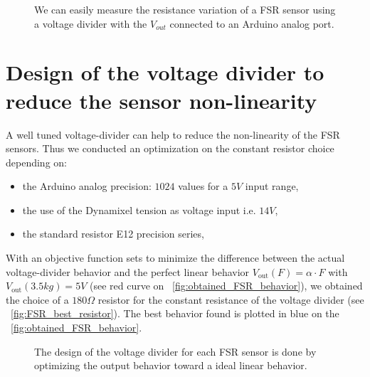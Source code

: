 \begin{figure}[!ht]
\centering
    \hfil
    \caption{We can easily measure the resistance variation of a FSR sensor using a voltage divider with the $V_{out}$ connected to an Arduino analog port.}
    \label{fig:test_sensors}
\end{figure}

\section{Design of the voltage divider to reduce the sensor non-linearity} %

A well tuned voltage-divider can help to reduce the non-linearity of the FSR sensors. Thus we conducted an optimization on the constant resistor choice depending on:
\begin{itemize}
    \item the Arduino analog precision: $1024$ values for a $5V$ input range,
    \item the use of the Dynamixel tension as voltage input i.e. $14V$,
    \item the standard resistor E12 precision series,
\end{itemize}

With an objective function sets to minimize the difference between the actual voltage-divider behavior and the perfect linear behavior $V_\mathrm{out}(F) = \alpha \cdot F$ with $V_\mathrm{out}(3.5kg) = 5V$ (see red curve on \figurename~\ref{fig:obtained_FSR_behavior}), we obtained the choice of a $180\Omega$ resistor for the constant resistance of the voltage divider (see \figurename~\ref{fig:FSR_best_resistor}). The best behavior found is plotted in blue on the \figurename~\ref{fig:obtained_FSR_behavior}.

\begin{figure}[ht]
\centering
    \hfil
    \caption{The design of the voltage divider for each FSR sensor is done by optimizing the output behavior toward a ideal linear behavior.}
    \label{fig:foot_sensor_behavior}
\end{figure}
